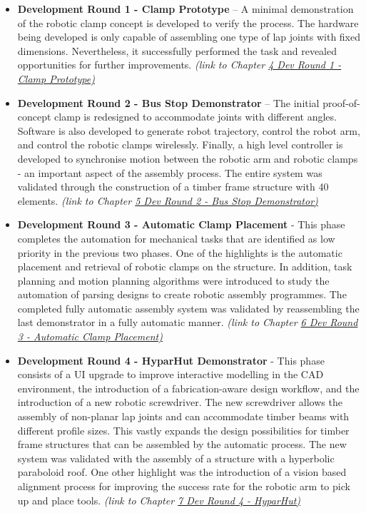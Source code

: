 \documentclass[11pt]{book}
\begin{document}
\begin{itemize}
	\item \textbf{Development Round 1 - Clamp Prototype }– A minimal demonstration of the robotic clamp concept is developed to verify the process. The hardware being developed is only capable of assembling one type of lap joints with fixed dimensions. Nevertheless, it successfully performed the task and revealed opportunities for further improvements. \textit{(link to Chapter \uline{4 Dev Round 1 - Clamp Prototype)}}

	\item \textbf{Development Round 2 - Bus Stop Demonstrator }– The initial proof-of-concept clamp is redesigned to accommodate joints with different angles. Software is also developed to generate robot trajectory, control the robot arm, and control the robotic clamps wirelessly. Finally, a high level controller is developed to synchronise motion between the robotic arm and robotic clamps - an important aspect of the assembly process. The entire system was validated through the construction of a timber frame structure with 40 elements. \textit{(link to Chapter \uline{5 Dev Round 2 - Bus Stop Demonstrator)}}

	\item \textbf{Development Round 3 - Automatic Clamp Placement} - This phase completes the automation for mechanical tasks that are identified as low priority in the previous two phases. One of the highlights is the automatic placement and retrieval of robotic clamps on the structure. In addition, task planning and motion planning algorithms were introduced to study the automation of parsing designs to create robotic assembly programmes. The completed fully automatic assembly system was validated by reassembling the last demonstrator in a fully automatic manner.  \textit{(link to Chapter \uline{6 Dev Round 3 - Automatic Clamp Placement)}}

	\item \textbf{Development Round 4 - HyparHut Demonstrator} - This phase consists of a UI upgrade to improve interactive modelling in the CAD environment, the introduction of a fabrication-aware design workflow, and the introduction of a new robotic screwdriver. The new screwdriver allows the assembly of non-planar lap joints and can accommodate timber beams with different profile sizes. This vastly expands the design possibilities for timber frame structures that can be assembled by the automatic process. The new system was validated with the assembly of a structure with a hyperbolic paraboloid roof. One other highlight was the introduction of a vision based alignment process for improving the success rate for the robotic arm to pick up and place tools. \textit{(link to Chapter \uline{7 Dev Round 4 - HyparHut) }}


\end{itemize}
\end{document}
